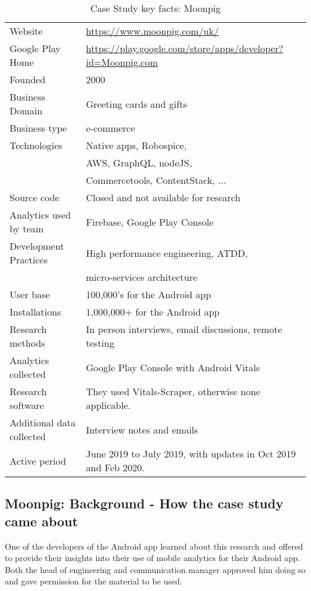 {\renewcommand{\arraystretch}{0.8}%
\begin{table*}
    \centering
    \small
    \setlength{\tabcolsep}{6pt}
    \begin{tabular}{lp{9cm}}
       \toprule
       Website &\url{https://www.moonpig.com/uk/} \\
       Google Play Home & \url{https://play.google.com/store/apps/developer?id=Moonpig.com} \\
       Founded &2000 \\
       Business Domain & Greeting cards and gifts \\
       Business type & e-commerce \\
       Technologies  & Native apps, Robospice, \\
       & AWS, GraphQL, nodeJS, \\
       & Commercetools, ContentStack, ... \\
       Source code  &Closed and not available for research \\
       Analytics used by team &Firebase, Google Play Console \\
       Development Practices & High performance engineering, ATDD, \\
         & micro-services architecture \\
       \midrule
       User base &100,000's for the Android app\\
       Installations &1,000,000+ for the Android app\\
       \midrule
       Research methods &In person interviews, email discussions, remote testing \\
       Analytics collected &Google Play Console with Android Vitals \\
       Research software &They used Vitals-Scraper, otherwise none applicable.\\
       Additional data collected &Interview notes and emails \\
       Active period &June 2019 to July 2019, with updates in Oct 2019 and Feb 2020. \\
       \bottomrule
    \end{tabular}
    \caption{Case Study key facts: Moonpig}
    \label{tab:moonpig_anaytics_overview}
\end{table*}
}

\subsection{Moonpig: Background - How the case study came about}
One of the developers of the Android app learned about this research and offered to provide their insights into their use of mobile analytics for their Android app. Both the head of engineering and communication manager approved him doing so and gave permission for the material to be used.


